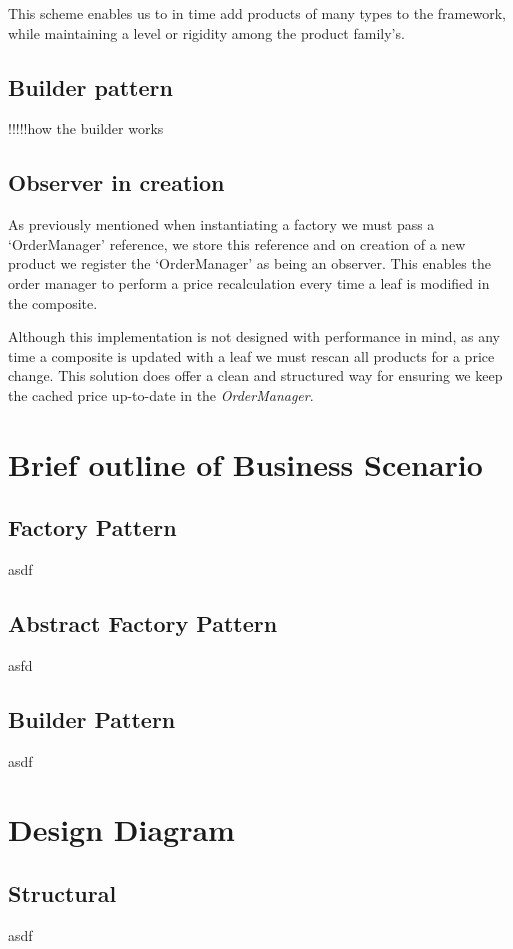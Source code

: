 \documentclass[pdftex,11pt,a4paper]{article}
\begin{document}
This scheme enables us to in time add products of many types to the framework, while maintaining a level or rigidity among the product family's.



\subsection{Builder pattern}

!!!!!how the builder works

\subsection{Observer in creation}
As previously mentioned when instantiating a factory we must pass a ‘OrderManager’ reference, we store this reference and on creation of a new product we register the ‘OrderManager’ as being an observer. This enables the order manager to perform a price recalculation every time a leaf is modified in the composite.

Although this implementation is not designed with performance in mind, as any time a composite is updated with a leaf we must rescan all products for a price change. This solution does offer a clean and structured way for ensuring we keep the cached price up-to-date in the \emph{OrderManager}.

\pagebreak

\section{Brief outline of Business Scenario}
\subsection{Factory Pattern}
asdf
\subsection{Abstract Factory Pattern}
asfd
\subsection{Builder Pattern}
asdf
\pagebreak

\section{Design Diagram}
\subsection{Structural}
asdf
\end{document}
